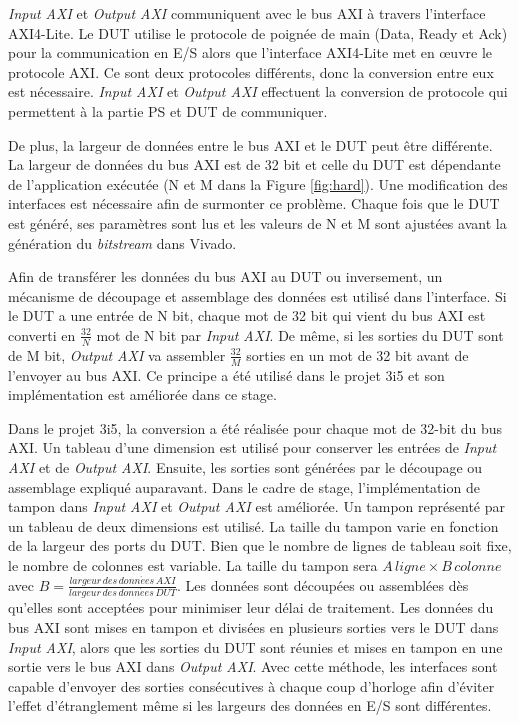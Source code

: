 \emph{Input AXI} et \emph{Output AXI} communiquent avec le bus AXI à travers l'interface AXI4-Lite.
Le DUT utilise le protocole de poignée de main (Data, Ready et Ack) pour
la communication en E/S alors que l'interface AXI4-Lite met en œuvre le protocole AXI.
Ce sont deux protocoles différents, donc la conversion entre eux est nécessaire. 
\emph{Input AXI} et \emph{Output AXI}
effectuent la conversion de protocole qui permettent à la partie PS et DUT de communiquer.

De plus, la largeur de données entre le bus AXI et le DUT peut être différente.
La largeur de données du bus AXI est de 32 bit et celle du DUT est dépendante de l'application
exécutée (N et M dans la Figure \ref{fig:hard}). Une modification des interfaces est nécessaire afin
de surmonter ce problème. Chaque fois que le DUT est généré, ses paramètres sont
lus et les valeurs de N et M sont ajustées avant la génération du \emph{bitstream} dans Vivado. 

Afin de transférer les données du bus AXI au DUT ou inversement, un mécanisme de découpage et assemblage
des données est utilisé dans l'interface. Si le DUT a une entrée de N bit, 
chaque mot de 32 bit qui vient du bus AXI est converti en $\frac{32}{N}$ mot de N bit par \emph{Input AXI}. De même,
si les sorties du DUT sont de M bit, \emph{Output AXI} va assembler $\frac{32}{M}$ sorties en un mot de 32 bit avant de l'envoyer
au bus AXI. Ce principe a été utilisé dans le projet 3i5 et son implémentation est améliorée dans ce stage.

Dans le projet 3i5, la conversion a été réalisée pour chaque mot de 32-bit du bus AXI. Un tableau d'une dimension
est utilisé pour conserver les entrées de \emph{Input AXI} et de \emph{Output AXI}. 
Ensuite, les sorties sont générées par le découpage ou assemblage expliqué auparavant.
Dans le cadre de stage, l'implémentation de tampon dans \emph{Input AXI} et \emph{Output AXI} est améliorée. 
Un tampon représenté par un tableau de deux dimensions est utilisé. 
La taille du tampon varie en fonction de la largeur des ports du DUT.
Bien que le nombre de lignes de tableau soit fixe, le nombre de colonnes est variable. La taille du tampon
sera $ A\,ligne \times B\, colonne$ avec $B = \frac{largeur \, des \, donn\acute{e}es \, AXI }{largeur \, des \, donn\acute{e}es \, DUT} $.
Les données sont découpées ou assemblées dès qu'elles sont acceptées pour minimiser leur délai de
traitement.
Les données du bus AXI sont mises en tampon et divisées en plusieurs sorties vers le DUT dans \emph{Input AXI},
alors que les sorties du DUT sont réunies et mises en tampon en une sortie vers le bus AXI dans \emph{Output AXI}.
Avec cette méthode, les interfaces sont capable d'envoyer des sorties consécutives à chaque coup d'horloge
afin d'éviter l'effet d'étranglement même si les largeurs des données en E/S sont différentes.

